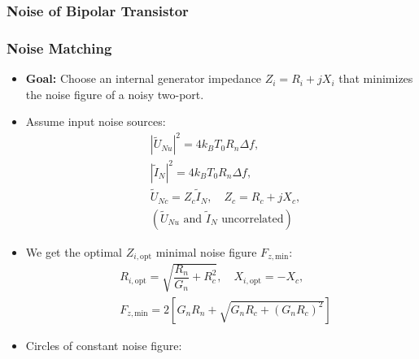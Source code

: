 \subsubsection{Noise of Bipolar Transistor}
\subsubsection{Noise Matching}
\begin{itemize}
    \item \textbf{Goal:} Choose an internal generator impedance $Z_i=R_i + jX_i$ that minimizes the noise figure of a noisy two-port.
    \item Assume input noise sources:
        \begin{align*}
            &|\tilde{U}_{Nu}|^2 = 4k_B T_0 R_n \Delta f,\\
            &|\tilde{I}_{N}|^2 = 4k_B T_0 R_n \Delta f,\\
            &\tilde{U}_{Nc} = Z_c \tilde{I}_N, \quad Z_c=R_c + jX_c,\\
            &(\tilde{U}_{Nu}\text{ and }\tilde{I}_N\text{ uncorrelated})
        \end{align*}
    \item We get the optimal $Z_{i,\mathrm{opt}}$ minimal noise figure $F_{z,\mathrm{min}}$:
        \begin{align*}
            &R_{i, \mathrm{opt}} = \sqrt{\dfrac{R_n}{G_n} + R_c^2},\quad X_{i, \mathrm{opt}} = -X_c,\\
            &F_{z,\mathrm{min}} = 2\left[G_n R_n + \sqrt{G_n R_c + (G_n R_c)^2}\right]
        \end{align*}
    \item Circles of constant noise figure:\\
\end{itemize}

